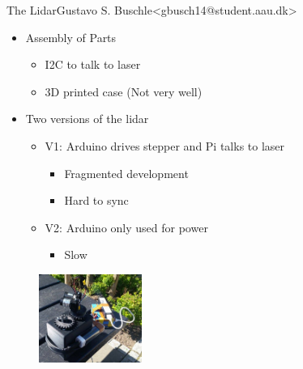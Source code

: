 \begin{frame}{The Lidar}{Gustavo S. Buschle\newline<gbusch14@student.aau.dk>}
    \begin{itemize}
        \item <1-> Assembly of Parts
            \begin{itemize}
                \item <2-> I2C to talk to laser
                \item <3-> 3D printed case (Not very well)
            \end{itemize}
        \item <4-> Two versions of the lidar
        \begin{itemize}
            \item <5-> V1: Arduino drives stepper and Pi talks to laser
                \begin{itemize}
                    \item <6-> Fragmented development
                    \item <7-> Hard to sync
                \end{itemize}
            \item <8-> V2: Arduino only used for power 
                \begin{itemize}
                    \item <9-> Slow
                \end{itemize}
        \end{itemize}
    \end{itemize}
        \begin{figure}[h!]
            \includegraphics[width=0.3\textwidth]{images/lidarpi.jpg}
        \end{figure}
\end{frame}

